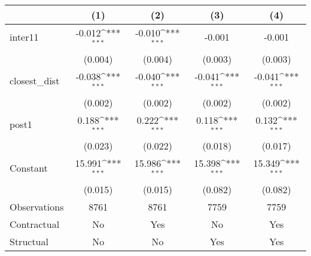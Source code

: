 {
\def\sym#1{\ifmmode^{#1}\else\(^{#1}\)\fi}
\begin{tabular}{l*{4}{c}}
\toprule
                &\multicolumn{1}{c}{(1)}         &\multicolumn{1}{c}{(2)}         &\multicolumn{1}{c}{(3)}         &\multicolumn{1}{c}{(4)}         \\
\midrule
inter11         &   -0.012\sym{***}&   -0.010\sym{***}&   -0.001         &   -0.001         \\
                &  (0.004)         &  (0.004)         &  (0.003)         &  (0.003)         \\
\addlinespace
closest\_dist    &   -0.038\sym{***}&   -0.040\sym{***}&   -0.041\sym{***}&   -0.041\sym{***}\\
                &  (0.002)         &  (0.002)         &  (0.002)         &  (0.002)         \\
\addlinespace
post1           &    0.188\sym{***}&    0.222\sym{***}&    0.118\sym{***}&    0.132\sym{***}\\
                &  (0.023)         &  (0.022)         &  (0.018)         &  (0.017)         \\
\addlinespace
Constant        &   15.991\sym{***}&   15.986\sym{***}&   15.398\sym{***}&   15.349\sym{***}\\
                &  (0.015)         &  (0.015)         &  (0.082)         &  (0.082)         \\
\midrule
Observations    &     8761         &     8761         &     7759         &     7759         \\
Contractual     &       No         &      Yes         &       No         &      Yes         \\
Structual       &       No         &       No         &      Yes         &      Yes         \\
\bottomrule
\end{tabular}
}
